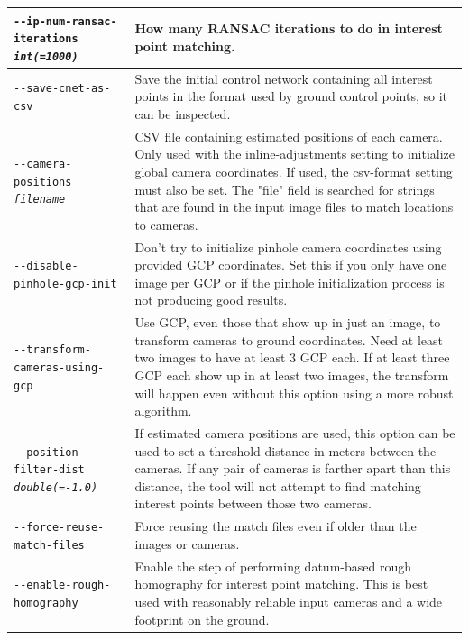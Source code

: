 \begin{longtable}{|p{8cm}|p{9cm}|}
\texttt{-\/-ip-num-ransac-iterations \textit{int(=1000)}} &
How many RANSAC iterations to do in interest point matching.
\\ \hline

\texttt{-\/-save-cnet-as-csv} & Save the initial control network containing all interest points in the format used by ground control points, so it can be inspected. \\ \hline

\texttt{-\/-camera-positions \textit{filename}} & CSV file containing estimated positions of each camera.
Only used with the inline-adjustments setting to initialize global camera coordinates. If used,
the csv-format setting must also be set.  The "file" field is searched for strings that are found
in the input image files to match locations to cameras.\\ \hline

\texttt{-\/-disable-pinhole-gcp-init} & Don't try to initialize pinhole camera coordinates using
provided GCP coordinates.  Set this if you only have one image per GCP or if the pinhole
initialization process is not producing good results. \\ \hline

\texttt{-\/-transform-cameras-using-gcp} & Use GCP, even those that show up in just an image, to transform cameras to ground coordinates. Need at least two images to have at least 3 GCP each. If at least three GCP each show up in at least two images, the transform will happen even without this option using a more robust algorithm. \\ \hline

\texttt{-\/-position-filter-dist \textit{double(=-1.0)}} &
If estimated camera positions are used, this option can be used to set a threshold distance in meters
between the cameras.  If any pair of cameras is farther apart than this distance, the tool will not
attempt to find matching interest points between those two cameras.
\\ \hline

\texttt{-\/-force-reuse-match-files} &
Force reusing the match files even if older than the images or cameras.
\\ \hline

\texttt{-\/-enable-rough-homography} & 
Enable the step of performing datum-based rough homography for interest point matching. This is best used with reasonably reliable input cameras and a wide footprint on the ground.
\\ \hline


\end{longtable}
